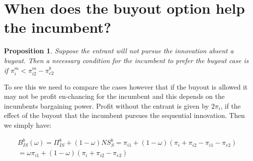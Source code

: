 \documentclass[11pt]{article}
\newtheorem{proposition}{Proposition}
\begin{document}








\section*{When does the buyout option help the incumbent?}



\begin{proposition}
Suppose the entrant will not pursue the innovation absent a buyout. Then a necessary condition for the incumbent to prefer the buyout case is if $\pi_i^m <\pi_{i2}^m-\pi_{e2}^b$
\end{proposition}

To see this we need to compare the cases  however that if the buyout is allowed it may not be profit en-chancing for the incumbent and this depends on the incumbents bargaining power. Profit without the entrant is given by $2 \pi_i$, if the effect of the buyout that the incumbent pursues the sequential innovation. Then we simply have:

\begin{align*}
B_{IS}^{b}(\omega)= \Pi_{IS}^{b}  +(1-\omega)NS_S^{b}= \pi_{i1}+(1-\omega)(\pi_i+\pi_{i2}-\pi_{i1}-\pi_{e2}) \\ 
= \omega \pi_{i1}+(1-\omega)(\pi_i+\pi_{i2}-\pi_{e2}) 
\end{align*}
\end{document}
